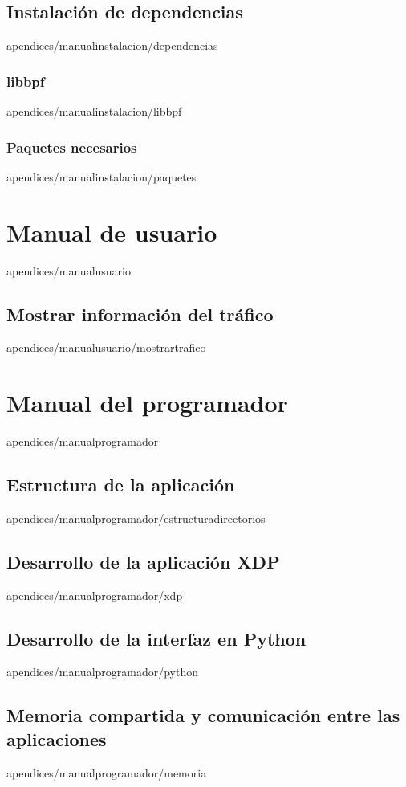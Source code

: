 \documentclass[epsbased,copyright,final,printable,covers,extendedindex,firstnumbered,tfg,gnuplot]{tfgtfmthesisuam}
\begin{document}
  \section{Instalación de dependencias\label{SEC:DEPENDENCIAS}}{apendices/manualinstalacion/dependencias}
    \subsection{libbpf\label{SEC:LIBBPF}}{apendices/manualinstalacion/libbpf}
    \subsection{Paquetes necesarios\label{SEC:PAQUETES}}{apendices/manualinstalacion/paquetes}
    
\chapter{Manual de usuario\label{CAP: PROGRAMADOR}}{apendices/manualusuario}
    \section{Mostrar información del tráfico\label{SEC:MOSTRARTRAFICO}}{apendices/manualusuario/mostrartrafico}


\chapter{Manual del programador\label{CAP: PROGRAMADOR}}{apendices/manualprogramador}
    \section{Estructura de la aplicación\label{SEC:ESTRUCTURAAPlICACION}}{apendices/manualprogramador/estructuradirectorios}
    \section{Desarrollo de la aplicación XDP\label{SEC:ENTORNOC}}{apendices/manualprogramador/xdp}
    \section{Desarrollo de la interfaz en Python\label{SEC:ENTORNOPYTHON}}{apendices/manualprogramador/python}
    \section{Memoria compartida y comunicación entre las aplicaciones\label{SEC:ENTORNOPYTHON}}{apendices/manualprogramador/memoria}
\end{document}
